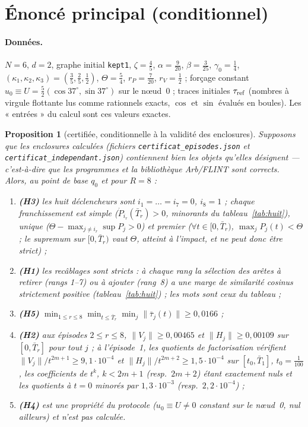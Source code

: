 \documentclass[11pt,a4paper]{article}
\newtheorem{proposition}[theoreme]{Proposition}
\theoremstyle{remark}
\newcommand{\norm}[1]{\lVert #1\rVert}
\begin{document}
\section{Énoncé principal (conditionnel)}
\paragraph{Données.} $N=6$, $d=2$, graphe initial \texttt{kept1}, $\zeta=\tfrac45$, $\alpha=\tfrac9{20}$, $\beta=\tfrac3{25}$, $\gamma_0=\tfrac14$, $(\kappa_1,\kappa_2,\kappa_3)=(\tfrac35,\tfrac25,\tfrac12)$, $\Theta=\tfrac54$, $r_P=\tfrac7{20}$, $r_V=\tfrac12$ ; forçage constant $u_0\equiv U=\tfrac52(\cos37^\circ,\sin37^\circ)$ sur le nœud~0 ; traces initiales $\tau_{\rm ref}$ (nombres à virgule flottante lus comme rationnels exacts, $\cos$ et $\sin$ évalués en boules). Les « entrées » du calcul sont ces valeurs exactes.

\begin{proposition}[certifiée, conditionnelle à la validité des enclosures]\label{prop:cert}
Supposons que les enclosures calculées (fichiers \texttt{certificat\_episodes.json} et \texttt{certificat\_independant.json}) contiennent bien les objets qu'elles désignent --- c'est-à-dire que les programmes et la bibliothèque Arb/FLINT sont corrects. Alors, au point de base $q_0$ et pour $R=8$ :
\begin{enumerate}[nosep,label=(\roman*)]
\item \textbf{(H3)} les huit déclencheurs sont $i_1=\dots=i_7=0$, $i_8=1$ ; chaque franchissement est simple ($\dot P_{i_r}(\bar T_r)>0$, minorants du tableau~\ref{tab:huit}), unique ($\Theta-\max_{j\ne i_r}\sup P_j>0$) et premier ($\forall t\in[0,\bar T_r)$, $\max_jP_j(t)<\Theta$ ; le supremum sur $[0,\bar T_r)$ vaut $\Theta$, atteint à l'impact, et ne peut donc être strict) ;
\item \textbf{(H1)} les recâblages sont stricts : à chaque rang la sélection des arêtes à retirer (rangs 1--7) ou à ajouter (rang~8) a une marge de similarité cosinus strictement positive (tableau~\ref{tab:huit}) ; les mots sont ceux du tableau ;
\item \textbf{(H5)} $\min_{1\le r\le8}\min_{t\le\bar T_r}\min_j\norm{\bar\tau_j(t)}\ge 0{,}0166$ ;
\item \textbf{(H2)} aux épisodes $2\le r\le8$, $\norm{V_j}\ge0{,}00465$ et $\norm{H_j}\ge0{,}00109$ sur $[0,\bar T_r]$ pour tout $j$ ; à l'épisode~1, les quotients de factorisation vérifient $\norm{V_j}/t^{2m+1}\ge 9{,}1\cdot10^{-4}$ et $\norm{H_j}/t^{2m+2}\ge1{,}5\cdot10^{-4}$ sur $[t_0,\bar T_1]$, $t_0=\tfrac1{100}$, les coefficients de $t^k$, $k<2m+1$ (resp.\ $2m+2$) étant exactement nuls et les quotients à $t=0$ minorés par $1{,}3\cdot10^{-3}$ (resp.\ $2{,}2\cdot10^{-4}$) ;
\item \textbf{(H4)} est une propriété du protocole ($u_0\equiv U\neq0$ constant sur le nœud~0, nul ailleurs) et n'est pas calculée.
\end{enumerate}
\end{proposition}
\end{document}
